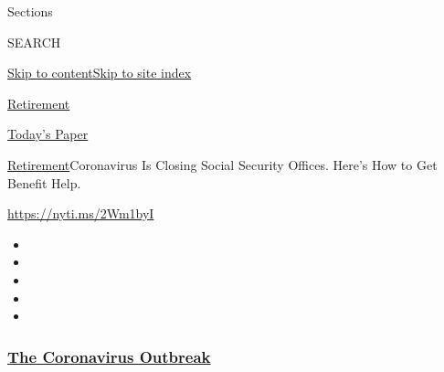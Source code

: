 Sections

SEARCH

\protect\hyperlink{site-content}{Skip to
content}\protect\hyperlink{site-index}{Skip to site index}

\href{https://www.nytimes3xbfgragh.onion/topic/subject/retirement}{Retirement}

\href{https://myaccount.nytimes3xbfgragh.onion/auth/login?response_type=cookie\&client_id=vi}{}

\href{https://www.nytimes3xbfgragh.onion/section/todayspaper}{Today's
Paper}

\href{/topic/subject/retirement}{Retirement}\textbar{}Coronavirus Is
Closing Social Security Offices. Here's How to Get Benefit Help.

\url{https://nyti.ms/2Wm1byI}

\begin{itemize}
\item
\item
\item
\item
\item
\end{itemize}

\hypertarget{the-coronavirus-outbreak}{%
\subsubsection{\texorpdfstring{\href{https://www.nytimes3xbfgragh.onion/news-event/coronavirus?name=styln-coronavirus-markets\&region=TOP_BANNER\&variant=undefined\&block=storyline_menu_recirc\&action=click\&pgtype=Article\&impression_id=c4c84340-e3a1-11ea-b662-63e62169161f}{The
Coronavirus
Outbreak}}{The Coronavirus Outbreak}}\label{the-coronavirus-outbreak}}

